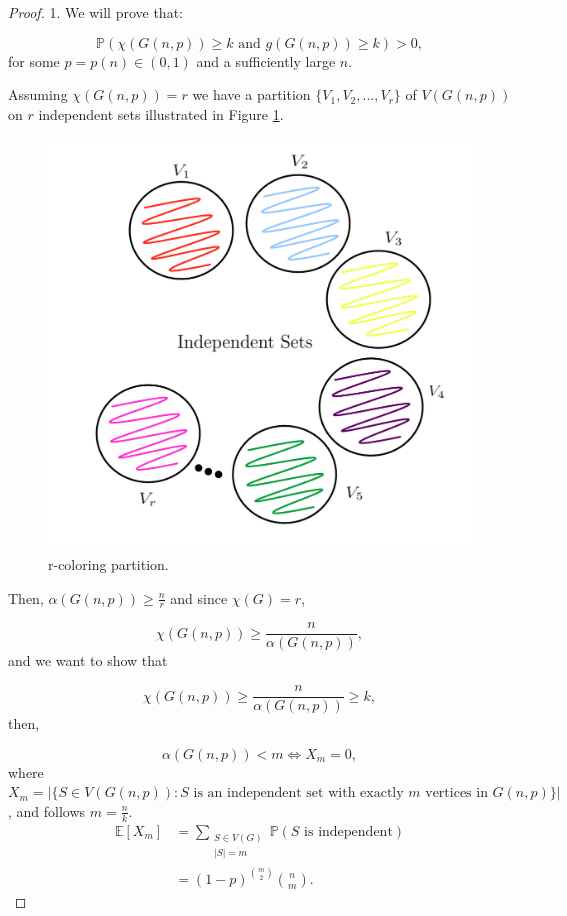 \documentclass[12pt,twoside,a4paper,bibliography=totocnumbered]{book}
\numberwithin{equation}{section}
\theoremstyle{remark}
\begin{document}
\begin{proof} 1.
We will prove that:

$$\mathbb{P}(\chi(G(n,p)) \geq k \text{ and } g(G(n,p)) \geq k) > 0 ,$$
for some $p =p(n) \in (0,1)$ and a sufficiently large $n$.

Assuming $\chi(G(n,p)) = r$ we have a partition $\{V_1,V_2,...,V_r\}$ of $V(G(n,p))$ on $r$ independent sets illustrated in Figure \ref{fig:r-partition}.
 
\begin{figure}[!htb]
     \centering
     \includegraphics[scale=1]{Figuras/r-partion.jpg}
     \caption{r-coloring partition. }
     \label{fig:r-partition}
\end{figure}

Then, $\alpha (G(n,p)) \geq \frac{n}{r}$ and since $\chi(G)=r$,

$$\chi(G(n,p)) \geq \frac{n}{\alpha(G(n,p))},$$
and we want to show that

$$\chi(G(n,p)) \geq \frac{n}{\alpha(G(n,p))} \geq k ,$$
then,

$$\alpha(G(n,p)) < m \iff X_m=0 ,$$
where 
$X_m = \big|\{S\in V(G(n,p))\colon \text{$S$ is an independent set with exactly $m$ vertices in $G(n,p)$}\}\big|$,
and follows $m = \frac{n}{k}$. 
\begin{align*}
\mathbb{E}[X_m]&=\sum_{\substack{S \in V(G) \\ |S| = m}} \mathbb{P}(S\text{ is independent})\\
&=(1-p)^{\binom{m}{2}} \binom{n}{m}.
\end{align*}


\end{proof}
\end{document}
